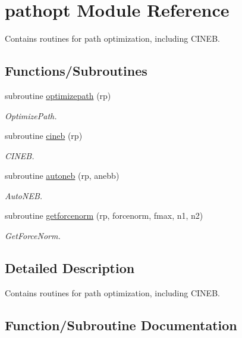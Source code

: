 \hypertarget{namespacepathopt}{}\section{pathopt Module Reference}
\label{namespacepathopt}


Contains routines for path optimization, including C\+I\+N\+EB.  


\subsection*{Functions/\+Subroutines}
\begin{DoxyCompactItemize}
\item 
subroutine \mbox{\hyperlink{namespacepathopt_a41a744efc5bab783a88663d6af98a777}{optimizepath}} (rp)
\begin{DoxyCompactList}\small\item\em Optimize\+Path. \end{DoxyCompactList}\item 
subroutine \mbox{\hyperlink{namespacepathopt_af8fbe251f61b7f4e756605041e19e1a0}{cineb}} (rp)
\begin{DoxyCompactList}\small\item\em C\+I\+N\+EB. \end{DoxyCompactList}\item 
subroutine \mbox{\hyperlink{namespacepathopt_af71f2239ddd07da673b810e0abe893d3}{autoneb}} (rp, anebb)
\begin{DoxyCompactList}\small\item\em Auto\+N\+EB. \end{DoxyCompactList}\item 
subroutine \mbox{\hyperlink{namespacepathopt_ae8d2e965e25545bf3c0e215694716108}{getforcenorm}} (rp, forcenorm, fmax, n1, n2)
\begin{DoxyCompactList}\small\item\em Get\+Force\+Norm. \end{DoxyCompactList}\end{DoxyCompactItemize}


\subsection{Detailed Description}
Contains routines for path optimization, including C\+I\+N\+EB. 

\subsection{Function/\+Subroutine Documentation}
\mbox{\label{namespacepathopt_a41a744efc5bab783a88663d6af98a777}} 

